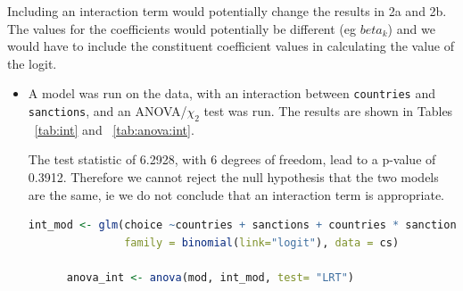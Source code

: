 \documentclass[12pt,letterpaper]{article}
\begin{document}
\begin{enumerate}
\begin{enumerate}
		Including an interaction term would potentially change the results in 2a and 2b.  The values for the coefficients would potentially be different (eg $beta_{k}$) and we would have to include the constituent coefficient values in calculating the value of the logit.
		
		\begin{itemize}

			\item A model was run on the data, with an interaction between \texttt{countries} and \texttt{sanctions}, and an ANOVA/$\chi_2$ test was run.  The results are shown in Tables ~\ref{tab:int} and ~\ref{tab:anova:int}.
			
			The test statistic of 6.2928, with 6 degrees of freedom, lead to a p-value of 0.3912.  Therefore we cannot reject the null hypothesis that the two models are the same, ie we do not conclude that an interaction term is appropriate.
			
      

      \begin{lstlisting}[language=R]
      int_mod <- glm(choice ~countries + sanctions + countries * sanctions,
               family = binomial(link="logit"), data = cs)

      anova_int <- anova(mod, int_mod, test= "LRT")
      \end{lstlisting}

		  
		  

		\end{itemize}
	\end{enumerate}
	\end{enumerate}
\end{document}
